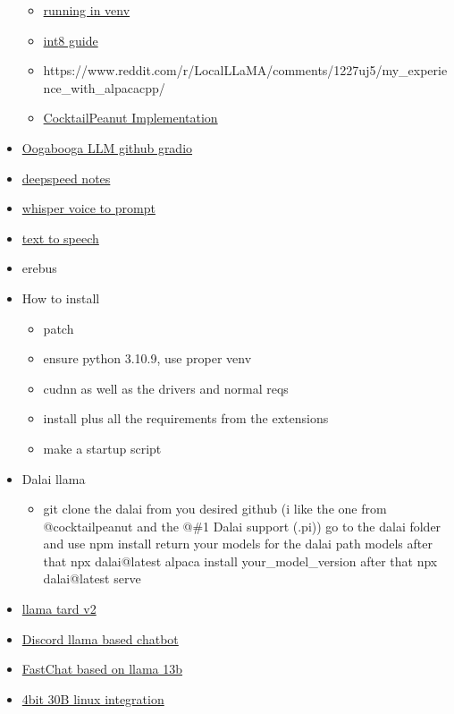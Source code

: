 \begin{itemize}
\begin{itemize}
  \item
    \href{https://www.reddit.com/r/MachineLearning/comments/11kwdu9/d_tutorial_run_llama_on_8gb_vram_on_windows/}{running
    in venv}
  \item
    \href{https://rentry.org/llama-tard-v2}{int8 guide}
  \item
    https://www.reddit.com/r/LocalLLaMA/comments/1227uj5/my\_experience\_with\_alpacacpp/
  \item
    \href{https://github.com/cocktailpeanut/dalai}{CocktailPeanut
    Implementation}
  \end{itemize}
\item
  \href{https://github.com/oobabooga/text-generation-webui}{Oogabooga
  LLM github gradio}
\item
  \href{https://github.com/oobabooga/text-generation-webui/issues/40\#issuecomment-1412038622}{deepspeed
  notes}
\item
  \href{https://github.com/oobabooga/text-generation-webui/tree/main/extensions/whisper_stt}{whisper
  voice to prompt}
\item
  \href{https://github.com/oobabooga/text-generation-webui/blob/main/extensions/silero_tts/script.py}{text
  to speech}
\item
  erebus
\item
  How to install

  \begin{itemize}
   
  \item
    patch
  \item
    ensure python 3.10.9, use proper venv
  \item
    cudnn as well as the drivers and normal reqs
  \item
    install plus all the requirements from the extensions
  \item
    make a startup script
  \end{itemize}
\item
  Dalai llama

  \begin{itemize}
   
  \item
    git clone the dalai from you desired github (i like the one from
    @cocktailpeanut and the @\#1 Dalai support (.pi)) go to the dalai
    folder and use npm install return your models for the dalai path
    models after that npx dalai@latest alpaca install
    your\_model\_version after that npx dalai@latest serve
  \end{itemize}
\item
  \href{https://rentry.org/llama-tard-v2}{llama tard v2}
\item
  \href{https://github.com/ortegaalfredo/celery-ai/blob/main/discord/bot.py}{Discord
  llama based chatbot}
\item
  \href{https://github.com/lm-sys/FastChat}{FastChat based on llama 13b}
\item
  \href{https://github.com/oobabooga/text-generation-webui/wiki/LLaMA-model}{4bit
  30B linux integration}


\end{itemize}
